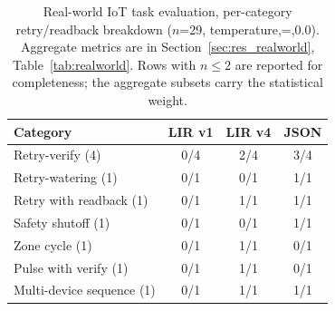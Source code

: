 \documentclass[a4paper,fleqn,longmktitle]{cas-dc}
\begin{document}
\begin{table}[t]
\centering
\caption{Random task generation, \texttt{llama3.1:8b} per-category breakdown ($n$=600, temperature,=,0.0). Aggregate metrics are reported in Section~\ref{sec:res_random}.}
\label{tab:app_random_percat}
\footnotesize
{}
\end{table}

\begin{table}[t]
\centering
\caption{Real-world IoT task evaluation, per-category retry/readback breakdown ($n$=29, temperature,=,0.0). Aggregate metrics are in Section~\ref{sec:res_realworld}, Table~\ref{tab:realworld}. Rows with $n \leq 2$ are reported for completeness; the aggregate subsets carry the statistical weight.}
\label{tab:app_realworld_percat}
\footnotesize
\begin{tabular}{lccc}
\toprule
Category & LIR v1 & LIR v4 & JSON \\
\midrule
Retry-verify (4) & 0/4 & 2/4 & 3/4 \\
Retry-watering (1) & 0/1 & 0/1 & 1/1 \\
Retry with readback (1) & 0/1 & 1/1 & 1/1 \\
Safety shutoff (1) & 0/1 & 0/1 & 1/1 \\
Zone cycle (1) & 0/1 & 1/1 & 0/1 \\
Pulse with verify (1) & 0/1 & 1/1 & 0/1 \\
Multi-device sequence (1) & 0/1 & 1/1 & 1/1 \\
\bottomrule
\end{tabular}
\end{table}
\end{document}

